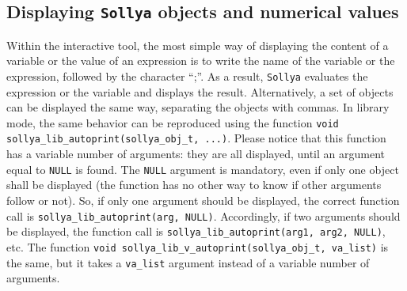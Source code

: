 \documentclass[a4paper]{article}
\newcommand{\sollya}{\texttt{Sollya}\xspace}
\begin{document}
\subsection{Displaying \sollya objects and numerical values}
Within the interactive tool, the most simple way of displaying the content of a variable or the value of an expression is to write the name of the variable or the expression, followed by the character ``;''. As a result, \sollya evaluates the expression or the variable and displays the result. Alternatively, a set of objects can be displayed the same way, separating the objects with commas. In library mode, the same behavior can be reproduced using the function \verb|void sollya_lib_autoprint(sollya_obj_t, ...)|. Please notice that this function has a variable number of arguments: they are all displayed, until an argument equal to \verb|NULL| is found. The \verb|NULL| argument is mandatory, even if only one object shall be displayed (the function has no other way to know if other arguments follow or not). So, if only one argument should be displayed, the correct function call is \verb|sollya_lib_autoprint(arg, NULL)|. Accordingly, if two arguments should be displayed, the function call is \verb|sollya_lib_autoprint(arg1, arg2, NULL)|, etc. The function \verb|void sollya_lib_v_autoprint(sollya_obj_t, va_list)| is the same, but it takes a \verb|va_list| argument instead of a variable number of arguments.
\end{document}
